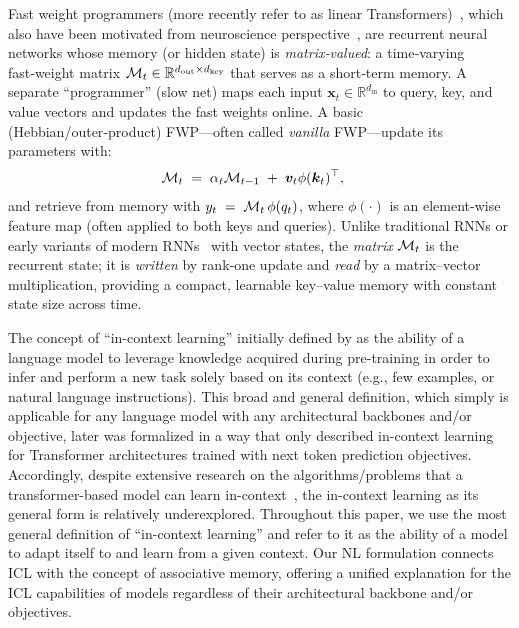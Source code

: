 Fast weight programmers (more recently refer to as linear Transformers)~\citep{schmidhuber1992learning, hinton1987using, ba2016using, schlag2021linear}, which also have been motivated from neuroscience perspective~\citep{gershman2025key}, are recurrent neural networks whose memory (or hidden state) is \emph{matrix‑valued}: a time‑varying fast‑weight matrix $\mathcal{M}_t\in\mathbb{R}^{d_{\mathrm{out}}\times d_{\mathrm{key}}}$ that serves as a short‑term memory. A separate “programmer” (slow net) maps each input $\boldsymbol{x}_t\in\mathbb{R}^{d_{\mathrm{in}}}$ to query, key, and value vectors and updates the fast weights online. A basic (Hebbian/outer‑product) FWP—often called \emph{vanilla} FWP—update its parameters with:
\begin{align}
    &\mathcal{M}_t \;=\; \alpha_t \mathcal{M}_{t-1} \;+\; \boldsymbol{v}_t \phi(\boldsymbol{k}_t)^{\top},
\end{align}
and retrieve from memory with $y_t \;=\; \mathcal{M}_t\,\phi(q_t)$, where $\phi(\cdot)$ is an element-wise feature map (often applied to both keys and queries). Unlike traditional RNNs or early variants of modern RNNs~\citep{LSTM, botev2024recurrentgemma, sun2023retentive} with vector states, the \emph{matrix} $\mathcal{M}_t$ is the recurrent state; it is \emph{written} by rank‑one update and \emph{read} by a matrix–vector multiplication, providing a compact, learnable key–value memory with constant state size across time.




The concept of ``in-context learning'' initially defined by \citet{brown2020language} as the ability of a language model to leverage knowledge acquired during pre-training in order to infer and perform a new task solely based on its context (e.g., few examples, or natural language instructions). This broad and general definition, which simply is applicable for any language model with any architectural backbones and/or objective, later was formalized in a way that only described in-context learning for Transformer architectures trained with next token prediction objectives. Accordingly, despite extensive research on the algorithms/problems that a transformer-based model can learn in-context~\citep{akyurek2022learning, akyurek2024context, dherin2025learning, zhang2024trained}, the in-context learning as its general form is relatively underexplored. Throughout this paper, we use the most general definition of ``in-context learning'' and refer to it as the ability of a model to adapt itself to and learn from a given context. Our NL formulation connects ICL with the concept of associative memory, offering a unified explanation for the ICL capabilities of models regardless of their architectural backbone and/or objectives. 





 
